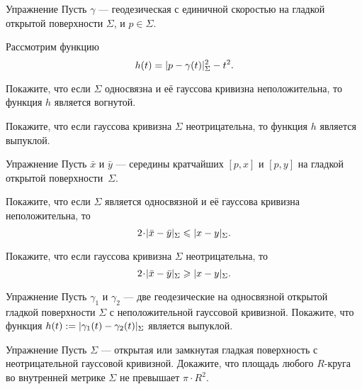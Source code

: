 \begin{thm}{Упражнение}\label{ex:geod-convexity}
Пусть $\gamma$ --- геодезическая с единичной скоростью на гладкой открытой поверхности
$\Sigma$, и $p\in\Sigma$.

Рассмотрим функцию
\[h(t)=\dist{p}{\gamma(t)}\Sigma^2-t^2.\]

\begin{subthm}{}
Покажите, что если $\Sigma$ односвязна и её гауссова кривизна неположительна, то функция $h$ является вогнутой.
\end{subthm}

\begin{subthm}{}
Покажите, что если гауссова кривизна $\Sigma$ неотрицательна, то функция $h$ является выпуклой.
\end{subthm}

\end{thm}

\begin{thm}{Упражнение}\label{ex:midpoints}
Пусть $\bar x$ и $\bar y$ --- середины кратчайших $[p,x]$ и $[p,y]$ на гладкой открытой поверхности~$\Sigma$.

\begin{subthm}{}
Покажите, что если $\Sigma$ является односвязной и её гауссова кривизна неположительна, то 
\[2\cdot \dist{\bar x}{\bar y}\Sigma\le \dist{x}{y}\Sigma.\]
\end{subthm}

\begin{subthm}{}
Покажите, что если гауссова кривизна $\Sigma$ неотрицательна, то 
 \[2\cdot \dist{\bar x}{\bar y}\Sigma\ge \dist{x}{y}\Sigma.\]
\end{subthm}

\end{thm}

\begin{thm}{Упражнение}\label{ex:convex-dist}
Пусть $\gamma_1$ и $\gamma_2$ --- две геодезические на односвязной открытой гладкой поверхности $\Sigma$ с неположительной гауссовой кривизной.
Покажите, что функция $h(t)\df\dist{\gamma_1(t)}{\gamma_2(t)}\Sigma$
является выпуклой.
\end{thm}

\begin{thm}{Упражнение}\label{ex:disc+}
Пусть $\Sigma$ --- открытая или замкнутая гладкая поверхность с неотрицательной гауссовой кривизной.
Докажите, что площадь любого $R$-круга во внутренней метрике $\Sigma$ не превышает $\pi\cdot R^2$.
\end{thm}

